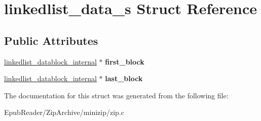 \hypertarget{structlinkedlist__data__s}{\section{linkedlist\-\_\-data\-\_\-s Struct Reference}
\label{structlinkedlist__data__s}
}
\subsection*{Public Attributes}
\begin{DoxyCompactItemize}
\item 
\hypertarget{structlinkedlist__data__s_aa0a9c876ad4a05aa5969d8888fb57cdb}{\hyperlink{structlinkedlist__datablock__internal__s}{linkedlist\-\_\-datablock\-\_\-internal} $\ast$ {\bfseries first\-\_\-block}}\label{structlinkedlist__data__s_aa0a9c876ad4a05aa5969d8888fb57cdb}

\item 
\hypertarget{structlinkedlist__data__s_a26afdb5141483c909dafb8c5fd016bb8}{\hyperlink{structlinkedlist__datablock__internal__s}{linkedlist\-\_\-datablock\-\_\-internal} $\ast$ {\bfseries last\-\_\-block}}\label{structlinkedlist__data__s_a26afdb5141483c909dafb8c5fd016bb8}

\end{DoxyCompactItemize}


The documentation for this struct was generated from the following file\-:\begin{DoxyCompactItemize}
\item 
Epub\-Reader/\-Zip\-Archive/minizip/zip.\-c\end{DoxyCompactItemize}
